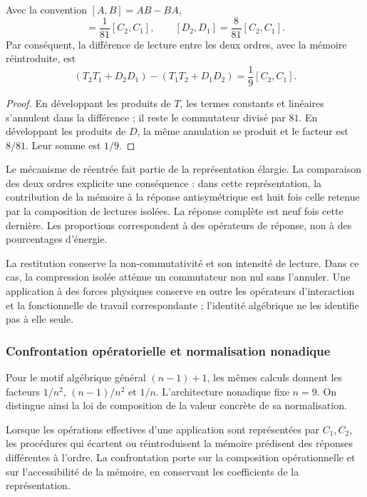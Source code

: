 \begin{proposition}
\label{md:restop:proposicion-orden}
Avec la convention $[A,B]=AB-BA$,
\begin{equation}
 [T_2,T_1]=\frac1{81}[C_2,C_1],\qquad
 [D_2,D_1]=\frac8{81}[C_2,C_1].
 \label{md:restop:reparto-conmutadores}
\end{equation}
Par conséquent, la différence de lecture entre les deux ordres, avec la
mémoire réintroduite, est
\begin{equation}
 \boxed{(T_2T_1+D_2D_1)-(T_1T_2+D_1D_2)
 =\frac19[C_2,C_1].}
 \label{md:restop:orden-completo}
\end{equation}
\end{proposition}
\begin{proof}
En développant les produits de $T$, les termes constants et linéaires
s’annulent dans la différence ; il reste le commutateur divisé par $81$.
En développant les produits de $D$, la même annulation se produit et le
facteur est $8/81$. Leur somme est $1/9$.
\end{proof}

Le mécanisme de réentrée fait partie de la représentation élargie.
La comparaison des deux ordres explicite une conséquence :
dans cette représentation, la contribution de la mémoire à la réponse
antisymétrique est huit fois celle retenue par la composition de lectures
isolées. La réponse complète est neuf fois cette dernière. Les
proportions correspondent à des opérateurs de réponse, non à des pourcentages
d’énergie.

La restitution conserve la non-commutativité et son intensité de lecture.
Dans ce cas, la compression isolée atténue un commutateur non nul sans
l’annuler. Une application à des forces physiques conserve en outre les opérateurs
d’interaction et la fonctionnelle de travail correspondante ; l’identité
algébrique ne les identifie pas à elle seule.

\subsubsection{Confrontation opératorielle et normalisation nonadique}
\label{md:restop:contraste}

Pour le motif algébrique général $(n-1)+1$, les mêmes calculs donnent les
facteurs $1/n^2$, $(n-1)/n^2$ et $1/n$. L’architecture nonadique fixe
$n=9$. On distingue ainsi la loi de composition de la valeur concrète de
sa normalisation.

Lorsque les opérations effectives d’une application sont représentées par
$C_1,C_2$, les procédures qui écartent ou réintroduisent la mémoire
prédisent des réponses différentes à l’ordre. La confrontation porte sur la
composition opérationnelle et sur l’accessibilité de la mémoire, en conservant
les coefficients de la représentation.

